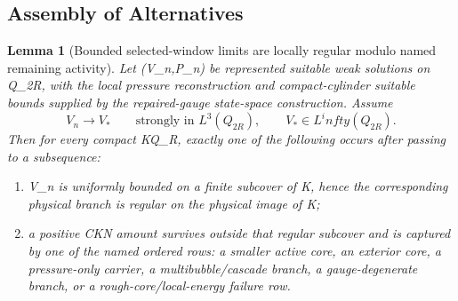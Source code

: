 \documentclass[11pt]{amsart}
\def\({}%
\def\){}%
\def\infty{infty}%
\theoremstyle{plain}
\newtheorem{lemma}[lemma]{Lemma}
\theoremstyle{definition}
\theoremstyle{remark}
\begin{document}
\subsection{Assembly of Alternatives}

\begin{lemma}[Bounded selected-window limits are locally regular modulo named remaining activity]
\label{paper6:lem:bounded-window-local-regularization}
\label{paper10:lem:bounded-selected-window-local-regularity}
Let \((V_n,P_n)\) be represented suitable weak solutions on \(Q_{2R}\), with
the local pressure reconstruction and compact-cylinder suitable bounds supplied
by the repaired-gauge state-space construction.  Assume
\[
  V_n\to V_*
  \qquad\text{strongly in }L^3(Q_{2R}),
  \qquad
  V_*\in L^\infty(Q_{2R}).
\]
Then for every compact \(K\Subset Q_R\), exactly one of the following occurs
after passing to a subsequence:
\begin{enumerate}[label=\textup{(\roman*)}]
\item \(V_n\) is uniformly bounded on a finite subcover of \(K\), hence the
corresponding physical branch is regular on the physical image of \(K\);
\item a positive CKN amount survives outside that regular subcover and is
captured by one of the named ordered rows: a smaller active core, an exterior
core, a pressure-only carrier, a multibubble/cascade branch, a
gauge-degenerate branch, or a rough-core/local-energy failure row.
\end{enumerate}
\end{lemma}
\end{document}

